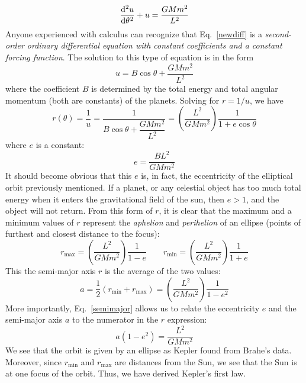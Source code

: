 \begin{equation}
  \diff[2]u\theta + u = \frac{GMm^2}{L^2}
  \label{newdiff}
\end{equation}
Anyone experienced with calculus can recognize that Eq.\ \ref{newdiff} is a
\emph{second-order ordinary differential equation with constant coefficients
  and a constant forcing function}. The solution to this type of equation is in
the form
\begin{equation} 
  u =B\cos\theta + \frac{GMm^2}{L^2}
\end{equation}
where the coefficient $B$ is determined by the total energy and total angular
momentum (both are constants) of the planets. Solving for $r=1/u$, we have
\begin{equation}
  r(\theta)=\frac1u = \frac1{B\cos\theta+ \dfrac{GMm^2}{L^2}}
  =\left(\dfrac{L^2}{GMm^2}\right)\frac1{1+e\cos\theta}
\end{equation}
where $e$ is a constant:
\begin{equation}
  e=\dfrac{BL^2}{GMm^2}
\end{equation}
It should become obvious that this $e$ is, in fact, the eccentricity of the
elliptical orbit previously mentioned. If a planet, or any celestial object
has too much total energy when it enters the gravitational field of the sun,
then $e>1$, and the object will not return. From this form of $r$, it is clear
that the maximum and a minimum values of $r$ represent the \emph{aphelion} and
\emph{perihelion} of an ellipse (points of furthest and closest distance to the
focus):
\begin{equation}
  r_\text{max}=\left(\frac{L^2}{GMm^2}\right)\frac1{1-e}
  \quad\quad
  r_\text{min}=\left(\frac{L^2}{GMm^2}\right)\frac1{1+e}
\end{equation}
This the semi-major axis $r$ is the average of the two values:
\begin{equation}
  a=\dfrac12\left(r_\text{min} + r_\text{max}\right)=
  \left(\frac{L^2}{GMm^2}\right)\frac1{1-e^2}
  \label{semimajor}
\end{equation}
More importantly, Eq.\ \ref{semimajor} allows us to relate the eccentricity
$e$ and the semi-major axis $a$ to the numerator in the $r$ expression:
\begin{equation}
  a(1-e^2)=\frac{L^2}{GMm^2}
  \label{eq:numerator}
\end{equation}
We see that the orbit is given by an ellipse as Kepler found from Brahe's data.
Moreover, since $r_\text{min}$ and $r_\text{max}$ are distances from the Sun, we
see that the Sun is at one focus of the orbit. Thus, we have derived Kepler's
first law.


